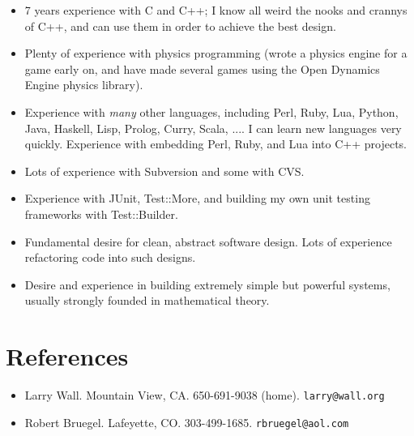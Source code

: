 \documentclass[12pt]{article}
\begin{document}
\begin{itemize}
\item 7 years experience with C and C++; I know all weird the nooks and
crannys of C++, and can use them in order to achieve the best design.
\item Plenty of experience with physics programming (wrote a physics
engine for a game early on, and have made several games using the Open
Dynamics Engine physics library).
\item Experience with \textit{many} other languages, including Perl,
Ruby, Lua, Python, Java, Haskell, Lisp, Prolog, Curry, Scala, ....  I
can learn new languages very quickly.  Experience with embedding Perl,
Ruby, and Lua into C++ projects. 
\item Lots of experience with Subversion and some with CVS.
\item Experience with JUnit, Test::More, and building my own unit
testing frameworks with Test::Builder.
\item Fundamental desire for clean, abstract software design.  Lots of
experience refactoring code into such designs.
\item Desire and experience in building extremely simple but powerful
systems, usually strongly founded in mathematical theory.
\end{itemize}

\section*{References}

\begin{itemize}
\item Larry Wall. Mountain View, CA.  650-691-9038 (home).
\verb|larry@wall.org|
\item Robert Bruegel.  Lafeyette, CO.  303-499-1685.
\verb|rbruegel@aol.com|
\end{itemize}
\end{document}
